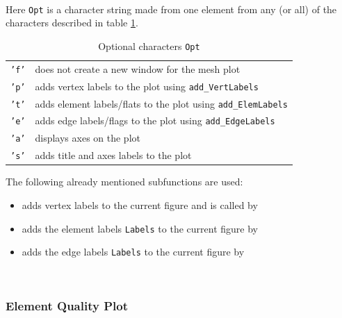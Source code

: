   \\
 
 Here {\tt Opt} is a character string made from one element from any (or all) of the characters described in table \ref{tab:plot_mesh_opt}.

\begin{table}[htb]
  \centering
  \begin{tabular}{p{0.5cm}p{8.5cm}}
	{\tt 'f'} & {\small does not create a new window for the mesh plot} \\
	{\tt 'p'} & {\small adds vertex labels to the plot using {\tt add\_VertLabels}} \\
	{\tt 't'} & {\small adds element labels/flats to the plot using {\tt add\_ElemLabels}} \\
	{\tt 'e'} & {\small adds edge labels/flags to the plot using {\tt add\_EdgeLabels}} \\
	{\tt 'a'} & {\small displays axes on the plot} \\
	{\tt 's'} & {\small adds title and axes labels to the plot}
  \end{tabular}
  \caption{Optional characters {\tt Opt}}
  \label{tab:plot_mesh_opt}
\end{table}

 The following already mentioned subfunctions are used:
\begin{itemize}
	\item {} adds vertex labels to the current figure and is called by


	\item {} adds the element labels {\tt Labels} to the current figure by


	\item {} adds the edge labels {\tt Labels} to the current figure by

		 \\

\end{itemize} %


\subsubsection{Element Quality Plot} 

